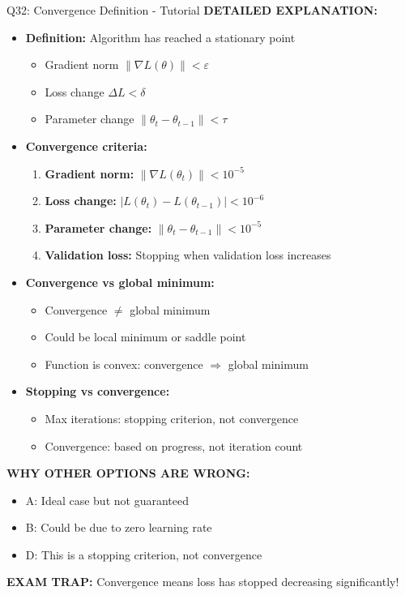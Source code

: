 \documentclass[8pt]{beamer}
\begin{document}
\begin{frame}{Q32: Convergence Definition - Tutorial}
		\vspace{0.05cm}
		\textbf{DETAILED EXPLANATION:}
		\begin{itemize}
			\item \textbf{Definition:} Algorithm has reached a stationary point
			\begin{itemize}
				\item Gradient norm $\|\nabla L(\theta)\| < \varepsilon$
				\item Loss change $\Delta L < \delta$
				\item Parameter change $\|\theta_t - \theta_{t-1}\| < \tau$
			\end{itemize}
			\item \textbf{Convergence criteria:}
			\begin{enumerate}
				\item \textbf{Gradient norm:} $\|\nabla L(\theta_t)\| < 10^{-5}$
				\item \textbf{Loss change:} $|L(\theta_t) - L(\theta_{t-1})| < 10^{-6}$
				\item \textbf{Parameter change:} $\|\theta_t - \theta_{t-1}\| < 10^{-5}$
				\item \textbf{Validation loss:} Stopping when validation loss increases
			\end{enumerate}
			\item \textbf{Convergence vs global minimum:}
			\begin{itemize}
				\item Convergence $\neq$ global minimum
				\item Could be local minimum or saddle point
				\item Function is convex: convergence $\Rightarrow$ global minimum
			\end{itemize}
			\item \textbf{Stopping vs convergence:}
			\begin{itemize}
				\item Max iterations: stopping criterion, not convergence
				\item Convergence: based on progress, not iteration count
			\end{itemize}
		\end{itemize}
		
		\vspace{0.05cm}
		\textcolor{myred}{\textbf{WHY OTHER OPTIONS ARE WRONG:}}
		\begin{itemize}
			\item \textcolor{myred}{A:} Ideal case but not guaranteed
			\item \textcolor{myred}{B:} Could be due to zero learning rate
			\item \textcolor{myred}{D:} This is a stopping criterion, not convergence
		\end{itemize}
		
		\textcolor{myred}{\textbf{EXAM TRAP:}} Convergence means \textcolor{myblue}{loss has stopped decreasing} significantly!
	\end{frame}
	
\end{document}
